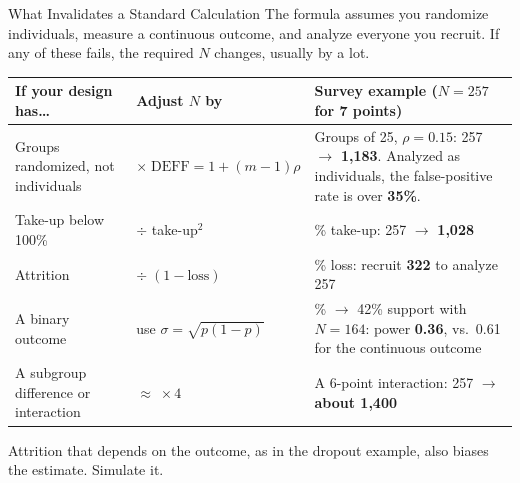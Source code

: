 \documentclass[
  ignorenonframetext,
  aspectratio=169,
]{beamer}
\begin{document}
\begin{frame}{What Invalidates a Standard Calculation}
\label{what-invalidates-a-standard-calculation}
\small The formula assumes you randomize individuals, measure a
continuous outcome, and analyze everyone you recruit. If any of these
fails, the required \(N\) changes, usually by a lot.

\vspace{0.3em}

\begin{center}
\scriptsize
\setlength{\tabcolsep}{6pt}
\renewcommand{\arraystretch}{1.2}
\begin{tabular}{>{\raggedright\arraybackslash}p{3.8cm}>{\raggedright\arraybackslash}p{3.4cm}>{\raggedright\arraybackslash}p{5.3cm}}
\toprule
\textbf{If your design has\ldots} & \textbf{Adjust $N$ by} & \textbf{Survey example ($N = 257$ for 7 points)} \\
\midrule
Groups randomized, not individuals & $\times\;\text{DEFF} = 1 + (m-1)\rho$
  & Groups of 25, $\rho = 0.15$: 257 $\rightarrow$ \textbf{1{,}183}. Analyzed as individuals, the false-positive rate is over \textcolor{errorred}{\textbf{35\%}}. \\
Take-up below 100\%    & $\div$ take-up$^2$      & 50\% take-up: 257 $\rightarrow$ \textbf{1{,}028} \\
Attrition              & $\div\;(1 - \text{loss})$ & 20\% loss: recruit \textbf{322} to analyze 257 \\
A binary outcome       & use $\sigma = \sqrt{p(1-p)}$  & 30\% $\rightarrow$ 42\% support with $N = 164$: power \textbf{0.36}, vs.\ 0.61 for the continuous outcome \\
A subgroup difference or interaction & $\approx\;\times 4$     & A 6-point interaction: 257 $\rightarrow$ \textbf{about 1{,}400} \\
\bottomrule
\end{tabular}
\end{center}

\vspace{0.2em}

\footnotesize Attrition that depends on the outcome, as in the dropout
example, also biases the estimate. Simulate it.
\end{frame}
\end{document}
